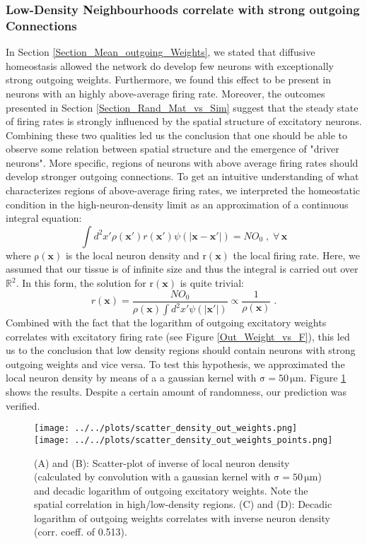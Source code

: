 \documentclass[10pt,a4paper]{article}
\begin{document}
\subsubsection{Low-Density Neighbourhoods correlate with strong outgoing Connections}
In Section \ref{Section_Mean_outgoing_Weights}, we stated that diffusive homeostasis allowed the network do develop few neurons with exceptionally strong outgoing weights. Furthermore, we found this effect to be present in neurons with an highly above-average firing rate. Moreover, the outcomes presented in Section \ref{Section_Rand_Mat_vs_Sim} suggest that the steady state of firing rates is strongly influenced by the spatial structure of excitatory neurons. Combining these two qualities led us the conclusion that one should be able to observe some relation between spatial structure and the emergence of "driver neurons". More specific, regions of neurons with above average firing rates should develop stronger outgoing connections. To get an intuitive understanding of what characterizes regions of above-average firing rates, we interpreted the homeostatic condition in the high-neuron-density limit as an approximation of a continuous integral equation:
\begin{equation}
\int d^2 x' \rho(\mathbf{x}') r(\mathbf{x}') \psi(|\mathbf{x}-\mathbf{x}'|) = NO_0 \; , \; \forall \, \mathbf{x}
\label{Density_Limit_Hom}
\end{equation}
where $\mathrm{\rho(\mathbf{x})}$ is the local neuron density and $\mathrm{r(\mathbf{x})}$ the local firing rate. Here, we assumed that our tissue is of infinite size and thus the integral is carried out over $\mathbb{R}^2$. In this form, the solution for $\mathrm{r(\mathbf{x})}$ is quite trivial:
\begin{equation}
r(\mathbf{x}) = \frac{NO_0}{\rho(\mathbf{x}) \int d^2 x' \psi(|\mathbf{x}'|)} \propto \frac{1}{\rho(\mathbf{x})} \; .
\label{Density_Limit_Hom_Solution}
\end{equation}
Combined with the fact that the logarithm of outgoing excitatory weights correlates with excitatory firing rate (see Figure \ref{Out_Weight_vs_F}), this led us to the conclusion that low density regions should contain neurons with strong outgoing weights and vice versa. To test this hypothesis, we approximated the local neuron density by means of a a gaussian kernel with $\mathrm{\sigma = 50\, \mu m}$. Figure \ref{Inverse_Dens_vs_Sum_Out_Weights} shows the results. Despite a certain amount of randomness, our prediction was verified. 
\begin{figure}
\texttt{[image: ../../plots/scatter\_density\_out\_weights.png]}
\texttt{[image: ../../plots/scatter\_density\_out\_weights\_points.png]}
\caption{(A) and (B): Scatter-plot of inverse of local neuron density (calculated by convolution with a gaussian kernel with $\mathrm{\sigma = 50\, \mu m}$) and decadic logarithm of outgoing excitatory weights. Note the spatial correlation in high/low-density regions. (C) and (D): Decadic logarithm of outgoing weights correlates with inverse neuron density (corr. coeff. of 0.513).}
\label{Inverse_Dens_vs_Sum_Out_Weights}
\end{figure}
\end{document}
